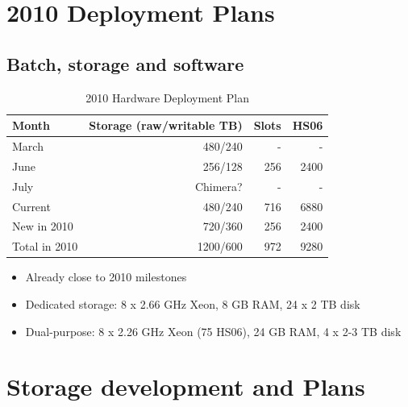 \documentclass{beamer}
\begin{document}
\section{2010 Deployment Plans}
\subsection{Batch, storage and software}
\begin{frame}
\begin{table}
\begin{tabular}{lrrr}
	\toprule
	Month					 	&	Storage (raw/writable TB)	&	Slots		& HS06 \\
	\midrule
	March					 	&	480/240										& - 			& - \\
	June						&	256/128										& 256			& 2400 \\
	July						&	Chimera?									&	-				&	- \\
	\midrule
	Current					& 480/240										& 716			& 6880 \\
	New in 2010			&	720/360										& 256 		& 2400 \\
	Total in 2010		&	1200/600									& 972 		& 9280 \\
	\bottomrule
\end{tabular}
\caption{2010 Hardware Deployment Plan}
\label{2010_hardware deployment_plan}
\end{table}

\begin{itemize}
	\item Already close to 2010 milestones
	\item Dedicated storage: 8 x 2.66 GHz Xeon, 8 GB RAM, 24 x 2 TB disk
	\item Dual-purpose: 8 x 2.26 GHz Xeon (75 HS06), 24 GB RAM, 4 x 2-3 TB disk
\end{itemize}

\end{frame}

\section{Storage development and Plans}
\end{document}
